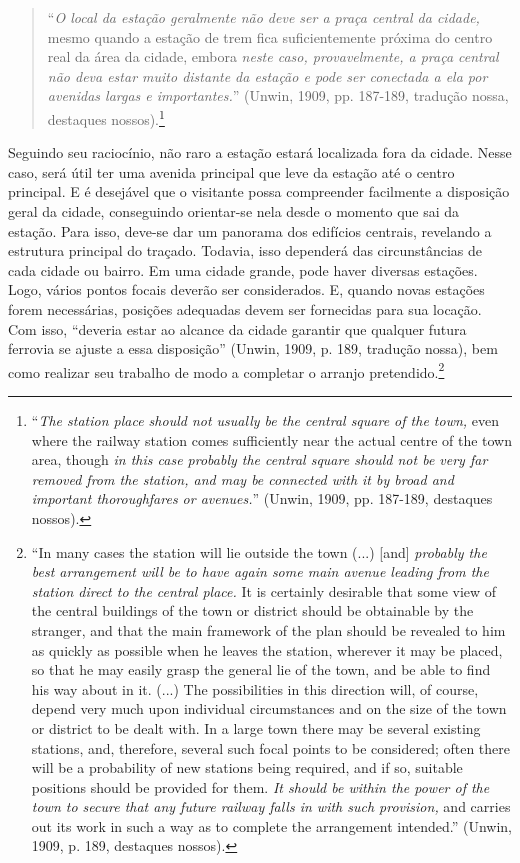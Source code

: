 \documentclass[12pt, a4paper]{book} %
\begin{document}
        \begin{quotation}
            ``\textit{O local da estação geralmente não deve ser a praça central da cidade,} mesmo quando a estação de trem fica suficientemente próxima do centro real da área da cidade, embora \textit{neste caso, provavelmente, a praça central não deva estar muito distante da estação e pode ser conectada a ela por avenidas largas e importantes.}'' (Unwin, 1909, pp. 187-189, tradução nossa, destaques nossos).\footnote[59]{``\textit{The station place should not usually be the central square of the town,} even where the railway station comes sufficiently near the actual centre of the town area, though \textit{in this case probably the central square should not be very far removed from the station, and may be connected with it by broad and important thoroughfares or avenues.}'' (Unwin, 1909, pp. 187-189, destaques nossos).}
        \end{quotation}

        Seguindo seu raciocínio, não raro a estação estará localizada fora da cidade. Nesse caso, será útil ter uma avenida principal que leve da estação até o centro principal. E é desejável que o visitante possa compreender facilmente a disposição geral da cidade, conseguindo orientar-se nela desde o momento que sai da estação. Para isso, deve-se dar um panorama dos edifícios centrais, revelando a estrutura principal do traçado. Todavia, isso dependerá das circunstâncias de cada cidade ou bairro. Em uma cidade grande, pode haver diversas estações. Logo, vários pontos focais deverão ser considerados. E, quando novas estações forem necessárias, posições adequadas devem ser fornecidas para sua locação. Com isso, ``deveria estar ao alcance da cidade garantir que qualquer futura ferrovia se ajuste a essa disposição'' (Unwin, 1909, p. 189, tradução nossa), bem como realizar seu trabalho de modo a completar o arranjo pretendido.\footnote[60]{``In many cases the station will lie outside the town (...) [and] \textit{probably the best arrangement will be to have again some main avenue leading from the station direct to the central place.} It is certainly desirable that some view of the central buildings of the town or district should be obtainable by the stranger, and that the main framework of the plan should be revealed to him as quickly as possible when he leaves the station, wherever it may be placed, so that he may easily grasp the general lie of the town, and be able to find his way about in it. (...) The possibilities in this direction will, of course, depend very much upon individual circumstances and on the size of the town or district to be dealt with. In a large town there may be several existing stations, and, therefore, several such focal points to be considered; often there will be a probability of new stations being required, and if so, suitable positions should be provided for them. \textit{It should be within the power of the town to secure that any future railway falls in with such provision,} and carries out its work in such a way as to complete the arrangement intended.'' (Unwin, 1909, p. 189, destaques nossos).}
\end{document}
